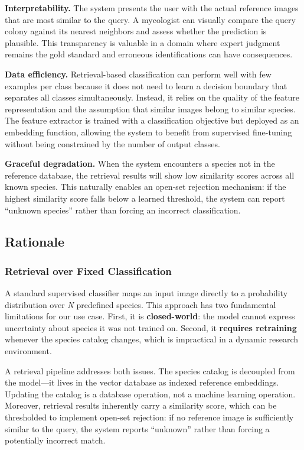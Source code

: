 \textbf{Interpretability.} The system presents the user with the actual reference images that are most similar to the query. A mycologist can visually compare the query colony against its nearest neighbors and assess whether the prediction is plausible. This transparency is valuable in a domain where expert judgment remains the gold standard and erroneous identifications can have consequences.

\textbf{Data efficiency.} Retrieval-based classification can perform well with few examples per class because it does not need to learn a decision boundary that separates all classes simultaneously. Instead, it relies on the quality of the feature representation and the assumption that similar images belong to similar species. The feature extractor is trained with a classification objective but deployed as an embedding function, allowing the system to benefit from supervised fine-tuning without being constrained by the number of output classes.

\textbf{Graceful degradation.} When the system encounters a species not in the reference database, the retrieval results will show low similarity scores across all known species. This naturally enables an open-set rejection mechanism: if the highest similarity score falls below a learned threshold, the system can report ``unknown species'' rather than forcing an incorrect classification.

\subsection{Rationale}\label{rationale}

\subsubsection{Retrieval over Fixed Classification}\label{retrieval-over-fixed-classification}

A standard supervised classifier maps an input image directly to a probability distribution over \emph{N} predefined species. This approach has two fundamental limitations for our use case. First, it is \textbf{closed-world}: the model cannot express uncertainty about species it was not trained on. Second, it \textbf{requires retraining} whenever the species catalog changes, which is impractical in a dynamic research environment.

A retrieval pipeline addresses both issues. The species catalog is decoupled from the model---it lives in the vector database as indexed reference embeddings. Updating the catalog is a database operation, not a machine learning operation. Moreover, retrieval results inherently carry a similarity score, which can be thresholded to implement open-set rejection: if no reference image is sufficiently similar to the query, the system reports ``unknown'' rather than forcing a potentially incorrect match.


